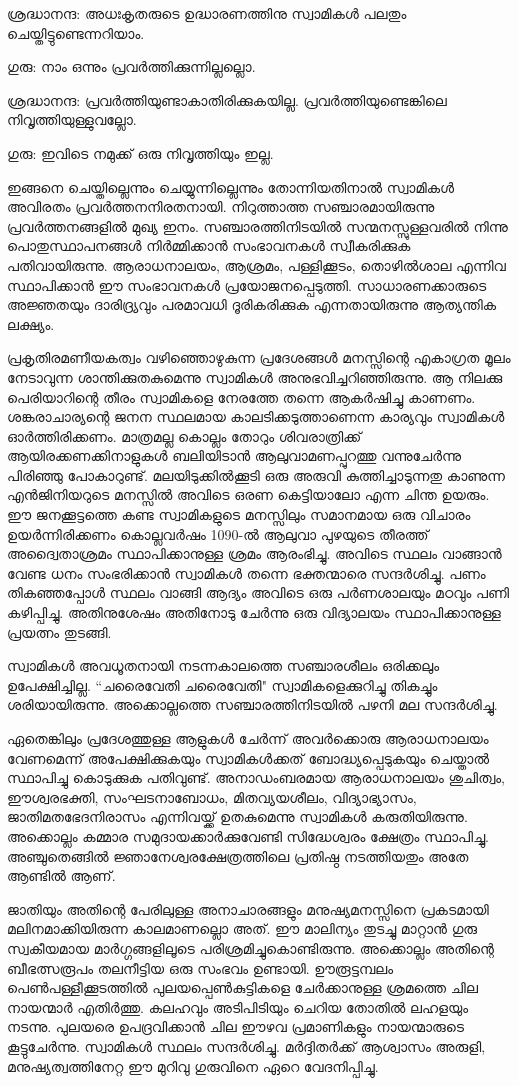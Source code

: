 \documentclass[12pt,openany]{book}
\begin{document}
	ശ്രദ്ധാനന്ദ: അധഃകൃതരുടെ ഉദ്ധാരണത്തിനു സ്വാമികൾ പലതും ചെയ്തിട്ടുണ്ടെന്നറിയാം.
	
	ഗുരു: നാം ഒന്നും പ്രവർത്തിക്കുന്നില്ലല്ലൊ.
	
	ശ്രദ്ധാനന്ദ: പ്രവർത്തിയുണ്ടാകാതിരിക്കുകയില്ല. പ്രവർത്തിയുണ്ടെങ്കിലെ നിവൃത്തിയുള്ളുവല്ലോ.
	
	ഗുരു: ഇവിടെ നമുക്ക് ഒരു നിവൃത്തിയും ഇല്ല.
	
	ഇങ്ങനെ ചെയ്തില്ലെന്നും ചെയ്യുന്നില്ലെന്നും തോന്നിയതിനാൽ സ്വാമികൾ അവിരതം പ്രവർത്തനനിരതനായി. നിറുത്താത്ത സഞ്ചാരമായിരുന്നു പ്രവർത്തനങ്ങളിൽ മുഖ്യ ഇനം. സഞ്ചാരത്തിനിടയിൽ സന്മനസ്സുള്ളവരിൽ നിന്നു പൊതുസ്ഥാപനങ്ങൾ നിർമ്മിക്കാൻ സംഭാവനകൾ സ്വീകരിക്കുക പതിവായിരുന്നു. ആരാധനാലയം, ആശ്രമം, പള്ളിക്കൂടം, തൊഴിൽശാല എന്നിവ സ്ഥാപിക്കാൻ ഈ സംഭാവനകൾ പ്രയോജനപ്പെടുത്തി. സാധാരണക്കാരുടെ അജ്ഞതയും ദാരിദ്ര്യവും പരമാവധി ദൂരികരിക്കുക എന്നതായിരുന്നു ആത്യന്തിക ലക്ഷ്യം.
	
	പ്രകൃതിരമണീയകത്വം വഴിഞ്ഞൊഴുകുന്ന പ്രദേശങ്ങൾ മനസ്സിന്റെ എകാഗ്രത മൂലം നേടാവുന്ന ശാന്തിക്കുതകുമെന്നു സ്വാമികൾ അനുഭവിച്ചറിഞ്ഞിരുന്നു. ആ നിലക്കു പെരിയാറിന്റെ തീരം സ്വാമികളെ നേരത്തേ തന്നെ ആകർഷിച്ചു കാണണം. ശങ്കരാചാര്യന്റെ ജനന സ്ഥലമായ കാലടിക്കടുത്താണെന്ന കാര്യവും സ്വാമികൾ ഓർത്തിരിക്കണം. മാത്രമല്ല കൊല്ലം തോറും ശിവരാത്രിക്ക് ആയിരക്കണക്കിനാളുകൾ ബലിയിടാൻ ആലുവാമണപ്പുറത്തു വന്നുചേർന്നു പിരിഞ്ഞു പോകാറുണ്ട്. മലയിടുക്കിൽക്കൂടി ഒരു അരുവി കുത്തിച്ചാടുന്നതു കാണുന്ന എൻജിനിയറുടെ മനസ്സിൽ അവിടെ ഒരണ കെട്ടിയാലോ എന്ന ചിന്ത ഉയരും. ഈ ജനക്കൂട്ടത്തെ കണ്ട സ്വാമികളുടെ മനസ്സിലും സമാനമായ ഒരു വിചാരം ഉയർന്നിരിക്കണം കൊല്ലവർഷം 1090-ൽ ആലുവാ പുഴയുടെ തീരത്ത് അദ്വൈതാശ്രമം സ്ഥാപിക്കാനുള്ള ശ്രമം ആരംഭിച്ചു. അവിടെ സ്ഥലം വാങ്ങാൻ വേണ്ട ധനം സംഭരിക്കാൻ സ്വാമികൾ തന്നെ ഭക്തന്മാരെ സന്ദർശിച്ചു. പണം തികഞ്ഞപ്പോൾ സ്ഥലം വാങ്ങി ആദ്യം അവിടെ ഒരു പർണശാലയും മഠവും പണി കഴിപ്പിച്ചു. അതിനുശേഷം അതിനോടു ചേർന്നു ഒരു വിദ്യാലയം സ്ഥാപിക്കാനുള്ള പ്രയത്നം തുടങ്ങി.
	
	സ്വാമികൾ അവധൂതനായി നടന്നകാലത്തെ സഞ്ചാരശീലം ഒരിക്കലും ഉപേക്ഷിച്ചില്ല. ``ചരൈവേതി ചരൈവേതി" സ്വാമികളെക്കുറിച്ചു തികച്ചും ശരിയായിരുന്നു. അക്കൊല്ലത്തെ സഞ്ചാരത്തിനിടയിൽ പഴനി മല സന്ദർശിച്ചു.
	
	ഏതെങ്കിലും പ്രദേശത്തുള്ള ആളുകൾ ചേർന്ന് അവർക്കൊരു ആരാധനാലയം വേണമെന്ന് അപേക്ഷിക്കുകയും സ്വാമികൾക്കത് ബോദ്ധ്യപ്പെടുകയും ചെയ്താൽ സ്ഥാപിച്ചു കൊടുക്കുക പതിവുണ്ട്. അനാഡംബരമായ ആരാധനാലയം ശുചിത്വം, ഈശ്വരഭക്തി, സംഘടനാബോധം, മിതവ്യയശീലം, വിദ്യാഭ്യാസം, ജാതിമതഭേദനിരാസം എന്നിവയ്ക്ക് ഉതകുമെന്നു സ്വാമികൾ കരുതിയിരുന്നു. അക്കൊല്ലം കമ്മാര സമുദായക്കാർക്കുവേണ്ടി സിദ്ധേശ്വരം ക്ഷേത്രം സ്ഥാപിച്ചു. അഞ്ചുതെങ്ങിൽ ജ്ഞാനേശ്വരക്ഷേത്രത്തിലെ പ്രതിഷ്ഠ നടത്തിയതും അതേ ആണ്ടിൽ ആണ്.
	
	ജാതിയും അതിന്റെ പേരിലുള്ള അനാചാരങ്ങളും മനുഷ്യമനസ്സിനെ പ്രകടമായി മലിനമാക്കിയിരുന്ന കാലമാണല്ലൊ അത്. ഈ മാലിന്യം തുടച്ചു മാറ്റാൻ ഗുരു സ്വകീയമായ മാർഗ്ഗങ്ങളിലൂടെ പരിശ്രമിച്ചുകൊണ്ടിരുന്നു. അക്കൊല്ലം അതിന്റെ ബീഭത്സരൂപം തലനീട്ടിയ ഒരു സംഭവം ഉണ്ടായി. ഊരൂട്ടമ്പലം പെൺപള്ളീക്കൂടത്തിൽ പുലയപ്പെൺകുട്ടികളെ ചേർക്കാനുള്ള ശ്രമത്തെ ചില നായന്മാർ എതിർത്തു. കലഹവും അടിപിടിയും ചെറിയ തോതിൽ ലഹളയും നടന്നു. പുലയരെ ഉപദ്രവിക്കാൻ ചില ഈഴവ പ്രമാണികളും നായന്മാരുടെ കൂട്ടുചേർന്നു. സ്വാമികൾ സ്ഥലം സന്ദർശിച്ചു. മർദ്ദിതർക്ക് ആശ്വാസം അരുളി, മനുഷ്യത്വത്തിനേറ്റ ഈ മുറിവു ഗുരുവിനെ ഏറെ വേദനിപ്പിച്ചു.
	
\end{document}

